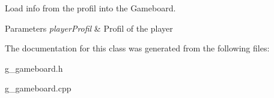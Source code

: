 Load info from the profil into the Gameboard. 


\begin{DoxyParams}{Parameters}
{\em player\+Profil} & Profil of the player \\
\hline
\end{DoxyParams}


The documentation for this class was generated from the following files\+:\begin{DoxyCompactItemize}
\item 
g\+\_\+gameboard.\+h\item 
g\+\_\+gameboard.\+cpp\end{DoxyCompactItemize}
